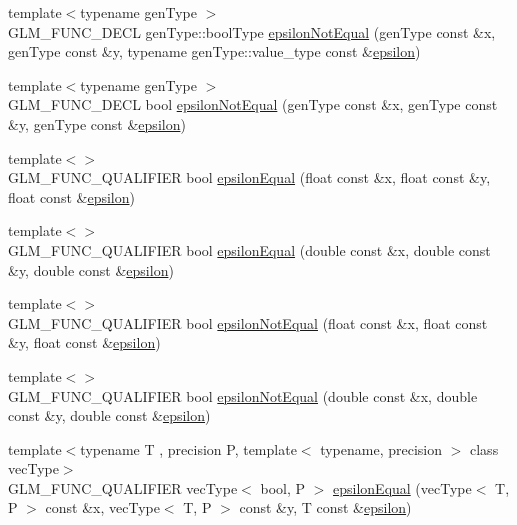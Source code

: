 \begin{DoxyCompactItemize}
\item 
{\footnotesize template$<$typename gen\+Type $>$ }\\G\+L\+M\+\_\+\+F\+U\+N\+C\+\_\+\+D\+E\+C\+L gen\+Type\+::bool\+Type \hyperlink{group__gtc__epsilon_ga14e2888a304654ade8a3996024e2739c}{epsilon\+Not\+Equal} (gen\+Type const \&x, gen\+Type const \&y, typename gen\+Type\+::value\+\_\+type const \&\hyperlink{group__gtc__constants_ga2a1e57fc5592b69cfae84174cbfc9429}{epsilon})
\item 
{\footnotesize template$<$typename gen\+Type $>$ }\\G\+L\+M\+\_\+\+F\+U\+N\+C\+\_\+\+D\+E\+C\+L bool \hyperlink{group__gtc__epsilon_ga50a92103fb0cbd796908e1bf20c79aaf}{epsilon\+Not\+Equal} (gen\+Type const \&x, gen\+Type const \&y, gen\+Type const \&\hyperlink{group__gtc__constants_ga2a1e57fc5592b69cfae84174cbfc9429}{epsilon})
\item 
{\footnotesize template$<$$>$ }\\G\+L\+M\+\_\+\+F\+U\+N\+C\+\_\+\+Q\+U\+A\+L\+I\+F\+I\+E\+R bool \hyperlink{namespaceglm_aded5e7ea9a0eacd03367ad77986c2a15}{epsilon\+Equal} (float const \&x, float const \&y, float const \&\hyperlink{group__gtc__constants_ga2a1e57fc5592b69cfae84174cbfc9429}{epsilon})
\item 
{\footnotesize template$<$$>$ }\\G\+L\+M\+\_\+\+F\+U\+N\+C\+\_\+\+Q\+U\+A\+L\+I\+F\+I\+E\+R bool \hyperlink{namespaceglm_a6e30ea38a0e3ebc25d87e667255057e5}{epsilon\+Equal} (double const \&x, double const \&y, double const \&\hyperlink{group__gtc__constants_ga2a1e57fc5592b69cfae84174cbfc9429}{epsilon})
\item 
{\footnotesize template$<$$>$ }\\G\+L\+M\+\_\+\+F\+U\+N\+C\+\_\+\+Q\+U\+A\+L\+I\+F\+I\+E\+R bool \hyperlink{namespaceglm_af4127d65f4afc6e447d461bae25f90fe}{epsilon\+Not\+Equal} (float const \&x, float const \&y, float const \&\hyperlink{group__gtc__constants_ga2a1e57fc5592b69cfae84174cbfc9429}{epsilon})
\item 
{\footnotesize template$<$$>$ }\\G\+L\+M\+\_\+\+F\+U\+N\+C\+\_\+\+Q\+U\+A\+L\+I\+F\+I\+E\+R bool \hyperlink{namespaceglm_a68d8ce38812c8599018e404afc79f088}{epsilon\+Not\+Equal} (double const \&x, double const \&y, double const \&\hyperlink{group__gtc__constants_ga2a1e57fc5592b69cfae84174cbfc9429}{epsilon})
\item 
{\footnotesize template$<$typename T , precision P, template$<$ typename, precision $>$ class vec\+Type$>$ }\\G\+L\+M\+\_\+\+F\+U\+N\+C\+\_\+\+Q\+U\+A\+L\+I\+F\+I\+E\+R vec\+Type$<$ bool, P $>$ \hyperlink{group__gtc__epsilon_gaca9443f217dc36587624247245522331}{epsilon\+Equal} (vec\+Type$<$ T, P $>$ const \&x, vec\+Type$<$ T, P $>$ const \&y, T const \&\hyperlink{group__gtc__constants_ga2a1e57fc5592b69cfae84174cbfc9429}{epsilon})

\end{DoxyCompactItemize}
